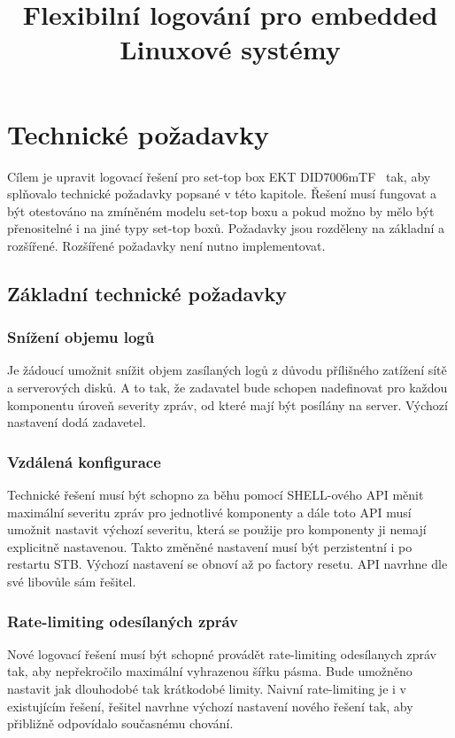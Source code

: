\documentclass[thesis=B,czech]{FITthesis}[2012/06/26]
\title{Flexibilní logování pro embedded Linuxové systémy}
\begin{document}
\begin{introduction}

\end{introduction}

\chapter{Technické požadavky}
Cílem je upravit logovací řešení pro set-top box EKT DID7006mTF~\cite{ekt7006} tak, aby splňovalo technické požadavky popsané v této kapitole. Řešení musí fungovat a být otestováno na zmíněném modelu set-top boxu a pokud možno by mělo být přenositelné i na jiné typy set-top boxů.
Požadavky jsou rozděleny na základní a rozšířené. Rozšířené požadavky není nutno implementovat.

\section{Základní technické požadavky}

\subsection{Snížení objemu logů}
Je žádoucí umožnit snížit objem zasílaných logů z důvodu přílišného zatížení sítě a serverových disků. A to tak, že zadavatel bude schopen nadefinovat pro každou komponentu úroveň severity zpráv, od které mají být posílány na server. Výchozí nastavení dodá zadavetel.

\subsection{Vzdálená konfigurace}
Technické řešení musí být schopno za běhu pomocí SHELL-ového API měnit maximální severitu zpráv pro jednotlivé komponenty a dále toto API musí umožnit nastavit výchozí severitu, která se použije pro komponenty ji nemají explicitně nastavenou. Takto změněné nastavení musí být perzistentní i po restartu STB. Výchozí nastavení se obnoví až po factory resetu. API navrhne dle své libovůle sám řešitel.

\subsection{Rate-limiting odesílaných zpráv}
Nové logovací řešení musí být schopné provádět rate-limiting odesílanych zpráv tak, aby nepřekročilo maximální vyhrazenou šířku pásma. Bude umožněno nastavit jak dlouhodobé tak krátkodobé limity. Naivní rate-limiting je i v existujícím řešení, řešitel navrhne výchozí nastavení nového řešení tak, aby přibližně odpovídalo současnému chování. 
\end{document}
